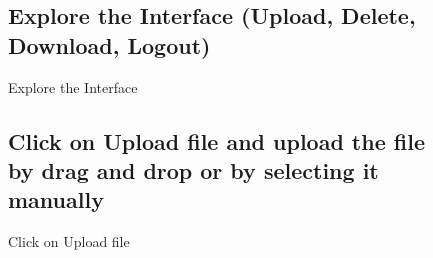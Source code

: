 \begin{figure}[h]
\subsection{Explore the Interface (Upload, Delete, Download, Logout)}
  \centering
   \caption{Explore the Interface}
\end{figure}

\begin{figure}[h]
\subsection{Click on Upload file and upload the file by drag and drop or by
selecting it manually}
  \centering
   \caption{Click on Upload file }
\end{figure}

